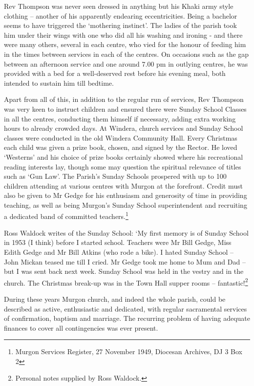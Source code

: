Rev Thompson was never seen dressed in anything but his Khaki army style clothing -- another of his apparently endearing eccentricities. Being a bachelor seems to have triggered the `mothering instinct'. The ladies of the parish took him under their wings with one who did all his washing and ironing - and there were many others, several in each centre, who vied for the honour of feeding him in the times between services in each of the centres. On occasions such as the gap between an afternoon service and one around 7.00 pm in outlying centres, he was provided with a bed for a well-deserved rest before his evening meal, both intended to sustain him till bedtime.



Apart from all of this, in addition to the regular run of services, Rev Thompson was very keen to instruct children and ensured there were Sunday School Classes in all the centres, conducting them himself if necessary, adding extra working hours to already crowded days. At Windera, church services and Sunday School classes were conducted in the old Windera Community Hall. Every Christmas each child was given a prize book, chosen, and signed by the Rector. He loved `Westerns' and his choice of prize books certainly showed where his recreational reading interests lay, though some may question the spiritual relevance of titles such as `Gun Law'. The Parish's Sunday Schools prospered with up to 100 children attending at various centres with Murgon at the forefront. Credit must also be given to Mr Gedge for his enthusiasm and generosity of time in providing teaching, as well as being Murgon's Sunday School superintendent and recruiting a dedicated band of committed teachers.\footnote{Murgon Services Register, 27 November 1949, Diocesan Archives, DJ 3 Box 2}


Ross Waldock writes of the Sunday School: `My first memory is of Sunday School in 1953 (I think) before I started school. Teachers were Mr Bill Gedge, Miss Edith Gedge and Mr Bill Atkins (who rode a bike). I hated Sunday School -- John Mickan teased me till I cried. Mr Gedge took me home to Mum and Dad -- but I was sent back next week. Sunday School was held in the vestry and in the church. The Christmas break-up was in the Town Hall supper rooms -- fantastic!\footnote{Personal notes supplied by Ross Waldock.}


During these years Murgon church, and indeed the whole parish, could be described as active, enthusiastic and dedicated, with regular sacramental services of confirmation, baptism and marriage. The recurring problem of having adequate finances to cover all contingencies was ever present.



